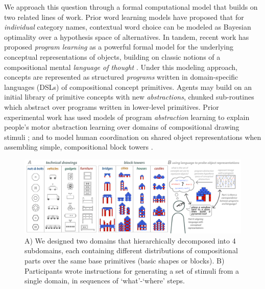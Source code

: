\documentclass[10pt,letterpaper]{article}
\begin{document}
We approach this question through a formal computational model that builds on two related lines of work. Prior word learning models  have proposed that for \textit{individual} category names, contextual word choice can be modeled as Bayesian optimality over a hypothesis space of alternatives. In tandem, recent work has proposed \textit{program learning} as a powerful formal model for the underlying conceptual representations of objects, building on classic notions of a compositional mental \textit{language of thought} . Under this modeling approach, concepts are represented as structured \textit{programs} written in  domain-specific languages (DSLs) of compositional concept primitives. Agents may build on an initial library of primitive concepts with new \textit{abstractions}, chunked sub-routines which abstract over programs written in lower-level primitives. Prior experimental work has used models of program \textit{abstraction} learning to explain people's motor abstraction learning over domains of compositional drawing stimuli ; and to model human coordination on shared object representations when assembling simple, compositional block towers .







\begin{figure}[h]
  \begin{center}
  \includegraphics[width=0.99\linewidth]{figures/lax_task.pdf}
  \caption{A) We designed two domains that hierarchically decomposed into 4 subdomains, each containing different distributions of compositional parts over the same base primitives (basic shapes or blocks). B) Participants wrote instructions for generating a set of stimuli from a single domain, in sequences of `what'-`where' steps.}
  \label{fig:task}
  \end{center}
 \end{figure}
\end{document}
